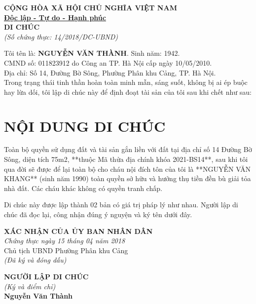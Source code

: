 \documentclass[12pt,a4paper]{article}
\begin{document}
\begin{center}
    \textbf{\large CỘNG HÒA XÃ HỘI CHỦ NGHĨA VIỆT NAM}\\
    \textbf{\underline{Độc lập - Tự do - Hạnh phúc}}\\[0.4cm]
    \textbf{\Large DI CHÚC}\\
    \textit{(Số chứng thực: 14/2018/DC-UBND)}
\end{center}

\vspace{0.4cm}

\noindent Tôi tên là: \textbf{NGUYỄN VĂN THÀNH}. Sinh năm: 1942.\\
CMND số: 011823912 do Công an TP. Hà Nội cấp ngày 10/05/2010.\\
Địa chỉ: Số 14, Đường Bờ Sông, Phường Phân khu Cảng, TP. Hà Nội.\\[0.2cm]
Trong trạng thái tinh thần hoàn toàn minh mẫn, sáng suốt, không bị ai ép buộc hay lừa dối, tôi lập di chúc này để định đoạt tài sản của tôi sau khi chết như sau:

\section*{NỘI DUNG DI CHÚC}
Toàn bộ quyền sử dụng đất và tài sản gắn liền với đất tại địa chỉ số 14 Đường Bờ Sông, diện tích 75m2, **thuộc Mã thửa địa chính khóa 2021-BS14**, sau khi tôi qua đời sẽ được để lại toàn bộ cho cháu nội đích tôn của tôi là **NGUYỄN VĂN KHANG** (sinh năm 1990) toàn quyền sở hữu và hưởng thụ tiền đền bù giải tỏa nhà đất. Các cháu khác không có quyền tranh chấp.

\vspace{0.4cm}

\noindent Di chúc này được lập thành 02 bản có giá trị pháp lý như nhau. Người lập di chúc đã đọc lại, công nhận đúng ý nguyện và ký tên dưới đây.

\vspace{0.6cm}

\noindent
\begin{minipage}[t]{0.5\textwidth}
    \small
    \textbf{XÁC NHẬN CỦA ỦY BAN NHÂN DÂN}\\
    \textit{Chứng thực ngày 15 tháng 04 năm 2018}\\
    Chủ tịch UBND Phường Phân khu Cảng\\
    \textit{(Đã ký và đóng dấu)}
\end{minipage}
\hfill
\begin{minipage}[t]{0.45\textwidth}
    \begin{center}
        \small
        \textbf{NGƯỜI LẬP DI CHÚC}\\
        \textit{(Ký và điểm chỉ)}\\[1.2cm]
        \textbf{Nguyễn Văn Thành}
    \end{center}
\end{minipage}
\end{document}
